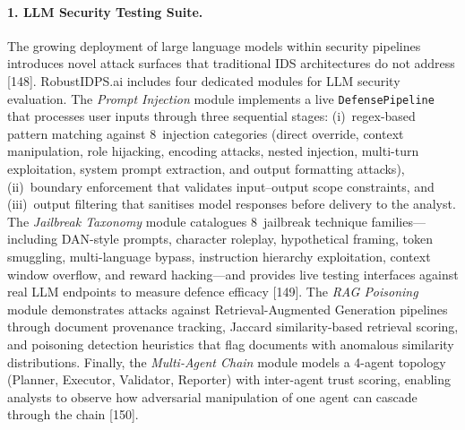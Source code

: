 \documentclass[12pt,a4paper]{article}
\begin{document}
\paragraph{1. LLM Security Testing Suite.}
The growing deployment of large language models within security
pipelines introduces novel attack surfaces that traditional IDS
architectures do not address [148].  RobustIDPS.ai includes four
dedicated modules for LLM security evaluation.  The \emph{Prompt
Injection} module implements a live \texttt{DefensePipeline} that
processes user inputs through three sequential stages: (i)~regex-based
pattern matching against 8~injection categories (direct override,
context manipulation, role hijacking, encoding attacks, nested
injection, multi-turn exploitation, system prompt extraction, and
output formatting attacks), (ii)~boundary enforcement that validates
input--output scope constraints, and (iii)~output filtering that
sanitises model responses before delivery to the analyst.  The
\emph{Jailbreak Taxonomy} module catalogues 8~jailbreak technique
families---including DAN-style prompts, character roleplay, hypothetical
framing, token smuggling, multi-language bypass, instruction hierarchy
exploitation, context window overflow, and reward hacking---and
provides live testing interfaces against real LLM endpoints to
measure defence efficacy [149].  The \emph{RAG Poisoning} module
demonstrates attacks against Retrieval-Augmented Generation pipelines
through document provenance tracking, Jaccard similarity-based
retrieval scoring, and poisoning detection heuristics that flag
documents with anomalous similarity distributions.  Finally, the
\emph{Multi-Agent Chain} module models a 4-agent topology (Planner,
Executor, Validator, Reporter) with inter-agent trust scoring,
enabling analysts to observe how adversarial manipulation of one agent
can cascade through the chain [150].
\end{document}
